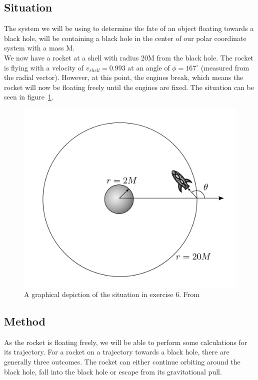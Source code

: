 \documentclass[reprint,english,notitlepage]{revtex4-2}
\begin{document}
    \subsection{Situation}\label{subsec:situation6}
        The system we will be using to determine the fate of an object floating towards a black hole, will be containing a black hole in the center of our polar coordinate system with a mass M.\\
        We now have a rocket at a shell with radius 20M from the black hole.
        The rocket is flying with a velocity of $v_{shell} = 0.993$ at an angle of $\phi = 167^{\circ}$ (measured from the radial vector).
        However, at this point, the engines break, which means the rocket will now be floating freely until the engines are fixed.
        The situation can be seen in figure~\ref{fig:setup6}.

        \begin{figure}[h]
            \centering
            \includegraphics[scale=0.3]{setup6}
            \caption{A graphical depiction of the situation in exercise 6. From~\parencite[][page 6]{part9}}\label{fig:setup6}
        \end{figure}


    \subsection{Method}\label{subsec:method6}
        As the rocket is floating freely, we will be able to perform some calculations for its trajectory.
        For a rocket on a trajectory towards a black hole, there are generally three outcomes.
        The rocket can either continue orbiting around the black hole, fall into the black hole or escape from its gravitational pull.\\
\end{document}
